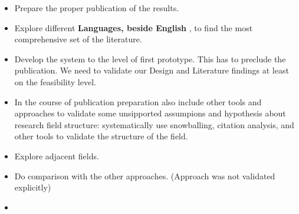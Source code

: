 \documentclass[runningheads]{llncs}
\begin{document}
\begin{itemize}

  \item Prepare the proper publication of the results.
  \item Explore different \textbf{ Languages, beside English }, to find the most comprehensive set of the literature.
  \item Develop the system to the level of first prototype. This has to preclude the publication. We need to validate our Design and Literature findings at least on the feasibility level.
  \item In the course of publication preparation also include other tools and approaches to validate some unsipported assumpions and hypothesis about research field structure: systematically use snowballing, citation analysis, and other tools to validate the structure of the field.
  \item Explore adjacent fields.
  \item Do comparison with the other approaches. (Approach was not validated explicitly)
  \item
\end{itemize}


\printbibliography
\end{document}
